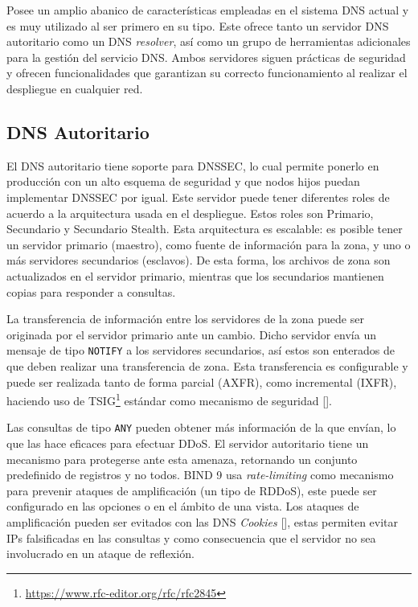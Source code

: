 Posee un amplio abanico de características empleadas en el sistema DNS actual y es muy utilizado al ser primero en su tipo. Este ofrece tanto un servidor DNS autoritario como un DNS \textit{resolver}, así como un grupo de herramientas adicionales para la gestión del servicio DNS. Ambos servidores siguen prácticas de seguridad y ofrecen funcionalidades que garantizan su correcto funcionamiento al realizar el despliegue en cualquier red.

\subsection{DNS Autoritario}

El DNS autoritario tiene soporte para DNSSEC, lo cual permite ponerlo en producción con un alto esquema de seguridad y que nodos hijos puedan implementar DNSSEC por igual. Este servidor puede tener diferentes roles de acuerdo a la arquitectura usada en el despliegue. Estos roles son Primario, Secundario y Secundario Stealth. Esta arquitectura es escalable: es posible tener un servidor primario (maestro), como fuente de información para la zona, y uno o más servidores secundarios (esclavos). De esta forma, los archivos de zona son actualizados en el servidor primario, mientras que los secundarios mantienen copias para responder a consultas.

La transferencia de información entre los servidores de la zona puede ser originada por el servidor primario ante un cambio. Dicho servidor envía un mensaje de tipo \verb+NOTIFY+ a los servidores secundarios, así estos son enterados de que deben realizar una transferencia de zona. Esta transferencia es configurable y puede ser realizada tanto de forma parcial (AXFR), como incremental (IXFR), haciendo uso de TSIG\footnote{\url{https://www.rfc-editor.org/rfc/rfc2845}} estándar como mecanismo de seguridad [\cite{bind-zone-transfer}].

Las consultas de tipo \verb+ANY+ pueden obtener más información de la que envían, lo que las hace eficaces para efectuar DDoS. El servidor autoritario tiene un mecanismo para protegerse ante esta amenaza, retornando un conjunto predefinido de registros y no todos. BIND 9 usa \textit{rate-limiting} como mecanismo para prevenir ataques de amplificación (un tipo de RDDoS), este puede ser configurado en las opciones o en el ámbito de una vista. Los ataques de amplificación pueden ser evitados con las DNS \textit{Cookies} [\cite{rfc_7873}], estas permiten evitar IPs falsificadas en las consultas y como consecuencia que el servidor no sea involucrado en un ataque de reflexión.

